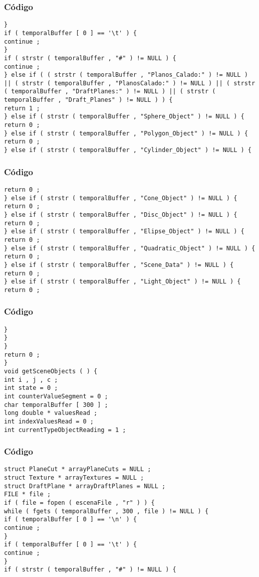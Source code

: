 \documentclass{beamer}
\begin{document}
\begin{frame}[fragile]
\frametitle{C\'odigo}
\begin{verbatim}
} 
if ( temporalBuffer [ 0 ] == '\t' ) { 
continue ; 
} 
if ( strstr ( temporalBuffer , "#" ) != NULL ) { 
continue ; 
} else if ( ( strstr ( temporalBuffer , "Planos_Calado:" ) != NULL ) || ( strstr ( temporalBuffer , "PlanosCalado:" ) != NULL ) || ( strstr ( temporalBuffer , "DraftPlanes:" ) != NULL ) || ( strstr ( temporalBuffer , "Draft_Planes" ) != NULL ) ) { 
return 1 ; 
} else if ( strstr ( temporalBuffer , "Sphere_Object" ) != NULL ) { 
return 0 ; 
} else if ( strstr ( temporalBuffer , "Polygon_Object" ) != NULL ) { 
return 0 ; 
} else if ( strstr ( temporalBuffer , "Cylinder_Object" ) != NULL ) { 
\end{verbatim}
\end{frame}
\begin{frame}[fragile]
\frametitle{C\'odigo}
\begin{verbatim}
return 0 ; 
} else if ( strstr ( temporalBuffer , "Cone_Object" ) != NULL ) { 
return 0 ; 
} else if ( strstr ( temporalBuffer , "Disc_Object" ) != NULL ) { 
return 0 ; 
} else if ( strstr ( temporalBuffer , "Elipse_Object" ) != NULL ) { 
return 0 ; 
} else if ( strstr ( temporalBuffer , "Quadratic_Object" ) != NULL ) { 
return 0 ; 
} else if ( strstr ( temporalBuffer , "Scene_Data" ) != NULL ) { 
return 0 ; 
} else if ( strstr ( temporalBuffer , "Light_Object" ) != NULL ) { 
return 0 ; 
\end{verbatim}
\end{frame}
\begin{frame}[fragile]
\frametitle{C\'odigo}
\begin{verbatim}
} 
} 
} 
return 0 ; 
} 
void getSceneObjects ( ) { 
int i , j , c ; 
int state = 0 ; 
int counterValueSegment = 0 ; 
char temporalBuffer [ 300 ] ; 
long double * valuesRead ; 
int indexValuesRead = 0 ; 
int currentTypeObjectReading = 1 ; 
\end{verbatim}
\end{frame}
\begin{frame}[fragile]
\frametitle{C\'odigo}
\begin{verbatim}
struct PlaneCut * arrayPlaneCuts = NULL ; 
struct Texture * arrayTextures = NULL ; 
struct DraftPlane * arrayDraftPlanes = NULL ; 
FILE * file ; 
if ( file = fopen ( escenaFile , "r" ) ) { 
while ( fgets ( temporalBuffer , 300 , file ) != NULL ) { 
if ( temporalBuffer [ 0 ] == '\n' ) { 
continue ; 
} 
if ( temporalBuffer [ 0 ] == '\t' ) { 
continue ; 
} 
if ( strstr ( temporalBuffer , "#" ) != NULL ) { 
\end{verbatim}
\end{frame}
\end{document}
